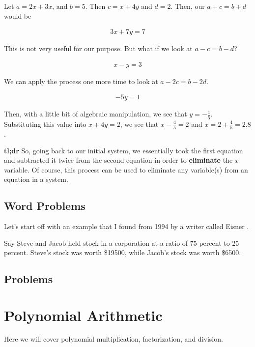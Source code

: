 \documentclass{scrbook}
\theoremstyle{definition}
\begin{document}
Let $a = 2x + 3x$, and $b = 5$. Then $c = x + 4y$ and $d = 2$. Then, our $a + c = b + d$ would be 

\begin{align*}
  3x + 7y = 7
\end{align*}

This is not very useful for our purpose. But what if we look at $a - c = b - d$?

\begin{align*}
  x - y = 3
\end{align*}

We can apply the process one more time to look at $a - 2c = b - 2d$. 

\begin{align*}
  - 5y = 1
\end{align*}

Then, with a little bit of algebraic manipulation, we see that $y = -\frac{1}{5}$. Substituting this value into $x + 4y = 2$, we see that $x - \frac{4}{5} = 2$ and $x = 2 + \frac{4}{5} = 2.8$. 

\textbf{tl;dr} So, going back to our initial system, we essentially took the first equation and subtracted it twice from the second equation in order to \textbf{eliminate} the $x$ variable. Of course, this process can be used to eliminate any variable(s) from an equation in a system. 

\subsection{Word Problems}



Let's start off with an example that I found from 1994 by a writer called Eisner \cite{eisner:1994}.

Say Steve and Jacob held stock in a corporation at a ratio of 75 percent to 25 percent. Steve's stock was worth \$19500, while Jacob's stock was worth \$6500. 

\subsection{Problems}

\section{Polynomial Arithmetic}

Here we will cover polynomial multiplication, factorization, and division.
\end{document}
